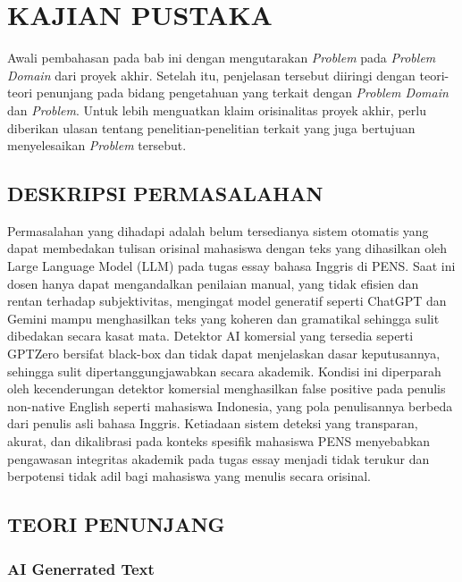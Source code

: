 \chapter{KAJIAN PUSTAKA}

Awali pembahasan pada bab ini dengan mengutarakan \textit{Problem} pada
\textit{Problem Domain} dari proyek akhir. Setelah itu, penjelasan tersebut diiringi
dengan teori-teori penunjang pada bidang pengetahuan yang terkait dengan
\textit{Problem Domain} dan \textit{Problem}. Untuk lebih menguatkan klaim orisinalitas
proyek akhir, perlu diberikan ulasan tentang penelitian-penelitian terkait yang juga
bertujuan menyelesaikan \textit{Problem} tersebut.

\section{DESKRIPSI PERMASALAHAN}

Permasalahan yang dihadapi adalah belum tersedianya sistem otomatis yang dapat membedakan tulisan orisinal mahasiswa dengan teks yang dihasilkan oleh Large Language Model (LLM) pada tugas essay bahasa Inggris di PENS. Saat ini dosen hanya dapat mengandalkan penilaian manual, yang tidak efisien dan rentan terhadap subjektivitas, mengingat model generatif seperti ChatGPT dan Gemini mampu menghasilkan teks yang koheren dan gramatikal sehingga sulit dibedakan secara kasat mata. Detektor AI komersial yang tersedia seperti GPTZero bersifat black-box dan tidak dapat menjelaskan dasar keputusannya, sehingga sulit dipertanggungjawabkan secara akademik. Kondisi ini diperparah oleh kecenderungan detektor komersial menghasilkan false positive pada penulis non-native English seperti mahasiswa Indonesia, yang pola penulisannya berbeda dari penulis asli bahasa Inggris. Ketiadaan sistem deteksi yang transparan, akurat, dan dikalibrasi pada konteks spesifik mahasiswa PENS menyebabkan pengawasan integritas akademik pada tugas essay menjadi tidak terukur dan berpotensi tidak adil bagi mahasiswa yang menulis secara orisinal.

\section{TEORI PENUNJANG}

\subsection{AI Generrated Text}

